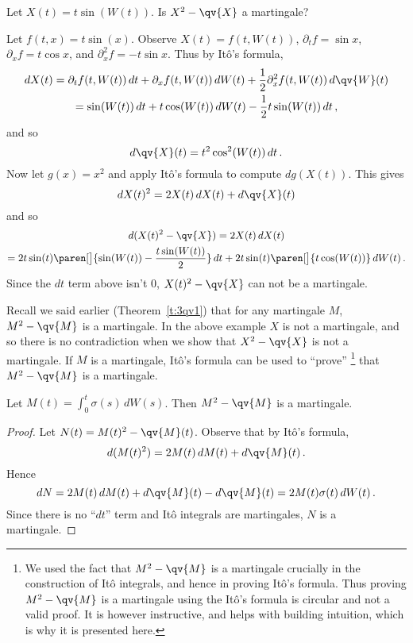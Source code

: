 \begin{example}
  Let $X(t) = t \sin( W(t) )$. Is $X^2 - \qv{X}$ a martingale?
\end{example}
\begin{sol}
  Let $f(t, x) = t \sin(x)$.
  Observe $X(t) = f(t, W(t))$, $\partial_t f = \sin x$, $\partial_x f = t \cos x$, and $\partial_x^2 f = - t \sin x$.
  Thus by It\^o's formula,
  \begin{multline*}
    dX(t)
      = \partial_t f( t, W(t)) \, dt + \partial_x f (t, W(t)) \, dW(t)
	+ \frac{1}{2} \partial_x^2 f(t, W(t)) \, d\qv{W}(t)
    \\
      = \sin(W(t)) \, dt + t \cos( W(t)) \, dW(t) - \frac{1}{2} t \sin(W(t)) \, dt\,,
  \end{multline*}
  and so
  \begin{equation*}
    d\qv{X}(t) = t^2 \cos^2(W(t)) \, dt\,.
  \end{equation*}
  Now let $g(x) = x^2$ and apply It\^o's formula to compute $d g(X(t))$.
  This gives
  \begin{equation*}
    d X(t)^2
      = 2 X(t) \, dX(t) + d\qv{X}(t)
  \end{equation*}
  and so
  \begin{multline*}
    d( X(t)^2 - \qv{X} )
      = 2 X(t) \, dX(t)
    \\
      = 2t \sin(t) \paren[\big]{ \sin(W(t)) - \frac{t \sin(W(t)) }{2} } \, dt
	+ 2t \sin(t) \paren[\big]{ t \cos(W(t)) } \, dW(t)\,.
  \end{multline*}
  Since the $dt$ term above isn't $0$, $X(t)^2 - \qv{X}$ can not be a martingale.
\end{sol}

Recall we said earlier (Theorem~\ref{t:3qv1}) that for any martingale $M$, $M^2 - \qv{M}$ is a martingale.
In the above example $X$ is not a martingale, and so there is no contradiction when we show that $X^2 - \qv{X}$ is not a martingale.
If $M$ is a martingale, It\^o's formula can be used to ``prove''%
\footnote{%
  We used the fact that $M^2 - \qv{M}$ is a martingale crucially in the construction of It\^o integrals, and hence in proving It\^o's formula.
  Thus proving $M^2 - \qv{M}$ is a martingale using the It\^o's formula is circular and not a valid proof.
  It is however instructive, and helps with building intuition, which is why it is presented here.%
}
that $M^2 - \qv{M}$ is a martingale.

\begin{proposition}
  Let $M(t)= \int_0^t \sigma(s) \, dW(s)$.
  Then $M^2 - \qv{M}$ is a martingale.
\end{proposition}
\begin{proof}
  Let $N(t) = M(t)^2 - \qv{M}(t)$.
  Observe that by It\^o's formula,
  \begin{equation*}
    d( M(t)^2 ) = 2 M(t) \, dM(t) + d\qv{M}(t)\,.
  \end{equation*}
  Hence
  \begin{equation*}
    d N = 2 M(t) \, dM(t) + d\qv{M}(t) - d\qv{M}(t)
      = 2M(t) \sigma(t) \, dW(t)\,.
  \end{equation*}
  Since there is no ``$dt$'' term and It\^o integrals are martingales, $N$ is a martingale.
\end{proof}

